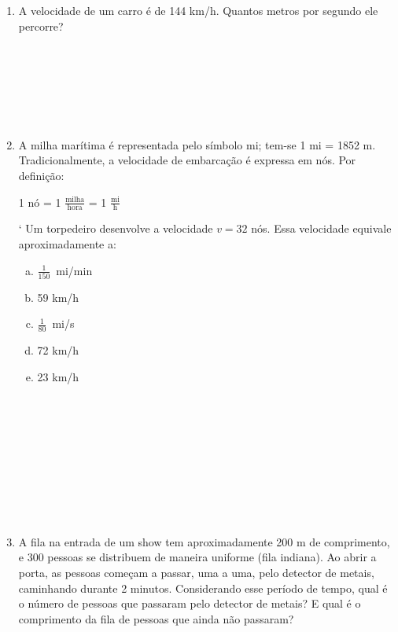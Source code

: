 \documentclass[a4paper,14pt]{article}
\begin{document}
\begin{multicols}{2}
\begin{enumerate}
            \item A velocidade de um carro é de 144 km/h. Quantos metros por segundo ele percorre? \\\\\\\\\\\\\\
            \item A milha marítima é representada pelo símbolo mi; tem-se 1 mi = 1852 m. Tradicionalmente, a velocidade de embarcação é expressa em nós. Por definição: \\
            \begin{center}
            	1 nó = 1 $\frac{\text{milha}}{\text{hora}}$ = 1 $\frac{\text{mi}}{\text{h}}$ 
            \end{center}`
            Um torpedeiro desenvolve a velocidade $v = 32$ nós. Essa velocidade equivale aproximadamente a:
            \begin{enumerate}[a)]
            	\item $\frac{1}{150}$~mi/min
            	\item 59 km/h
            	\item $\frac{1}{80}$~mi/s
            	\item 72 km/h
            	\item 23 km/h \\\\\\\\\\\\\\\\\\\\
            \end{enumerate}
            \item A fila na entrada de um show tem aproximadamente 200 m de comprimento, e 300 pessoas se distribuem de maneira uniforme (fila indiana). Ao abrir a porta, as pessoas começam a passar, uma a uma, pelo detector de metais, caminhando durante 2 minutos. Considerando esse período de tempo, qual é o número de pessoas que passaram pelo detector de metais? E qual é o comprimento da fila de pessoas que ainda não passaram? \\\\\\\\\\\\\\\\\\\\

\end{enumerate}
\end{multicols}
\end{document}
